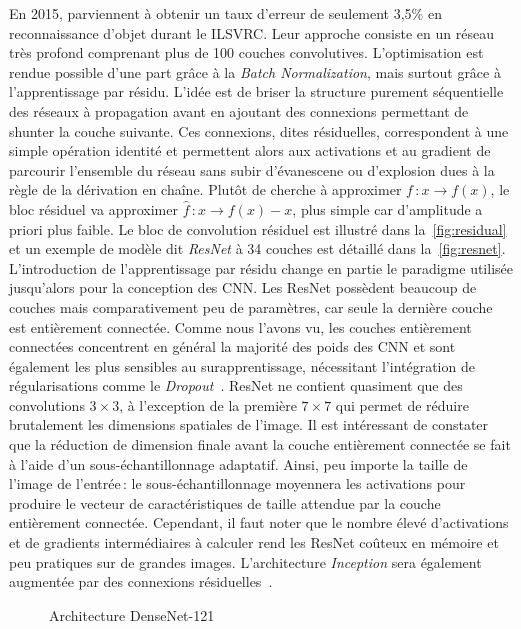En 2015, \citet{he_deep_2016} parviennent à obtenir un taux d'erreur de seulement 3,5\% en reconnaissance d'objet durant le \gls{ILSVRC}. Leur approche consiste en un réseau très profond comprenant plus de 100 couches convolutives. L'optimisation est rendue possible d'une part grâce à la \emph{Batch Normalization}, mais surtout grâce à l'apprentissage par résidu. L'idée est de briser la structure purement séquentielle des réseaux à propagation avant en ajoutant des connexions permettant de shunter la couche suivante. Ces connexions, dites résiduelles, correspondent à une simple opération identité et permettent alors aux activations et au gradient de parcourir l'ensemble du réseau sans subir d'évanescene ou d'explosion dues à la règle de la dérivation en chaîne. Plutôt de cherche à approximer $f\,: x \rightarrow f(x)$, le bloc résiduel va approximer $\hat{f}\,: x \rightarrow f(x) - x$, plus simple car d'amplitude a priori plus faible. Le bloc de convolution résiduel est illustré dans la~\cref{fig:residual} et un exemple de modèle dit \emph{ResNet} à 34 couches est détaillé dans la~\cref{fig:resnet}. L'introduction de l'apprentissage par résidu change en partie le paradigme utilisée jusqu'alors pour la conception des \gls{CNN}. Les ResNet possèdent beaucoup de couches mais comparativement peu de paramètres, car seule la dernière couche est entièrement connectée. Comme nous l'avons vu, les couches entièrement connectées concentrent en général la majorité des poids des \gls{CNN} et sont également les plus sensibles au surapprentissage, nécessitant l'intégration de régularisations comme le \emph{Dropout}~\cite{srivastava_dropout_2014}. ResNet ne contient quasiment que des convolutions $3\times3$, à l'exception de la première $7\times7$ qui permet de réduire brutalement les dimensions spatiales de l'image. Il est intéressant de constater que la réduction de dimension finale avant la couche entièrement connectée se fait à l'aide d'un sous-échantillonnage adaptatif. Ainsi, peu importe la taille de l'image de l'entrée\,: le sous-échantillonnage moyennera les activations pour produire le vecteur de caractéristiques de taille attendue par la couche entièrement connectée. Cependant, il faut noter que le nombre élevé d'activations et de gradients intermédiaires à calculer rend les ResNet coûteux en mémoire et peu pratiques sur de grandes images. L'architecture \emph{Inception} sera également augmentée par des connexions résiduelles~\cite{szegedy_inception-v4_2016}.


\begin{figure}[t]
  \resizebox{\textwidth}{!}{
    
  }
  \caption{Architecture DenseNet-121~\cite{huang_densely_2017}}
  \label{fig:densenet}
\end{figure}

